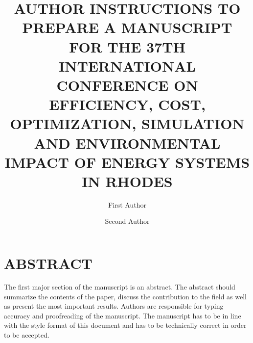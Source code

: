 \title{AUTHOR INSTRUCTIONS TO PREPARE A MANUSCRIPT FOR THE 37TH INTERNATIONAL CONFERENCE ON EFFICIENCY, COST, OPTIMIZATION, SIMULATION AND ENVIRONMENTAL IMPACT OF ENERGY SYSTEMS IN RHODES}

\author[1]{First Author}
\author[2,*]{Second Author}


\maketitle	

\section*{ABSTRACT}
The first major section of the manuscript is an abstract. The abstract should summarize the contents of the paper, discuss the contribution to the field as well as present the most important results. Authors are responsible for typing accuracy and proofreading of the manuscript. The manuscript has to be in line with the style format of this document and has to be technically correct in order to be accepted.